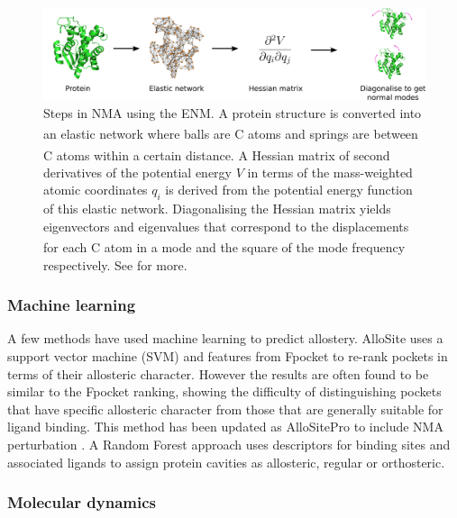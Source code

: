 \begin{figure}
\centering

\includegraphics[width=\textwidth]{figures/nma/nma}

\caption[Steps in normal mode analysis]
{Steps in NMA using the ENM.
A protein structure is converted into an elastic network where balls are C\textsuperscript{\textalpha} atoms and springs are between C\textsuperscript{\textalpha} atoms within a certain distance.
A Hessian matrix of second derivatives of the potential energy $V$ in terms of the mass-weighted atomic coordinates $q_{i}$ is derived from the potential energy function of this elastic network.
Diagonalising the Hessian matrix yields eigenvectors and eigenvalues that correspond to the displacements for each C\textsuperscript{\textalpha} atom in a mode and the square of the mode frequency respectively.
See \cite{Hayward2008} for more.}

\label{fig:nma}
\end{figure}


\subsubsection{Machine learning}

A few methods have used machine learning to predict allostery.
AlloSite \cite{Huang2013} uses a support vector machine (SVM) and features from Fpocket \cite{LeGuilloux2009} to re-rank pockets in terms of their allosteric character.
However the results are often found to be similar to the Fpocket ranking, showing the difficulty of distinguishing pockets that have specific allosteric character from those that are generally suitable for ligand binding.
This method has been updated as AlloSitePro to include NMA perturbation \cite{Song2017}.
A Random Forest approach \cite{Chen2016} uses descriptors for binding sites and associated ligands to assign protein cavities as allosteric, regular or orthosteric.


\subsubsection{Molecular dynamics}

